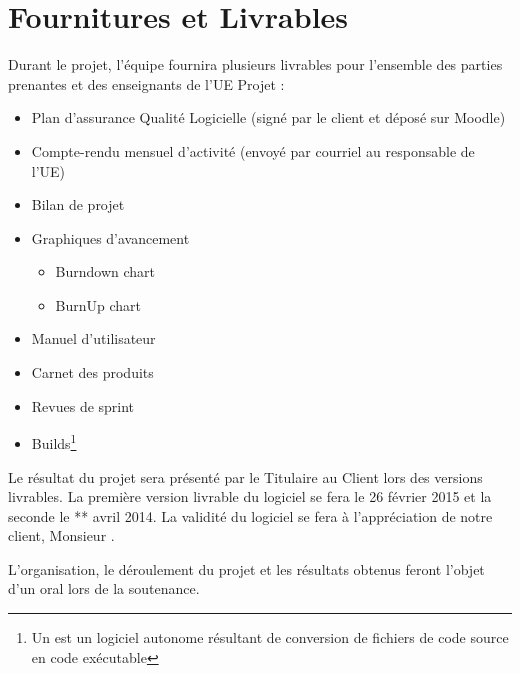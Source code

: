 \chapter{Fournitures et Livrables}
Durant le projet, l’équipe fournira plusieurs livrables pour l’ensemble des parties prenantes et des enseignants de l’UE Projet :

\begin{itemize}
	\item Plan d'assurance Qualité Logicielle (signé par le client et déposé sur Moodle)
	\item Compte-rendu mensuel d'activité (envoyé par courriel au responsable de l'UE)
	\item Bilan de projet
	\item Graphiques d’avancement
	\begin{itemize}
		\item Burndown chart
		\item BurnUp chart
	\end{itemize}
	\item Manuel d’utilisateur 
	\item Carnet des produits 
	\item Revues de sprint
	\item Builds\footnote{Un  est un  logiciel autonome résultant de conversion de fichiers de code source en code exécutable}
\end{itemize}

Le résultat du projet sera présenté par le Titulaire au Client lors des versions livrables. La première version livrable du logiciel se fera le 26 février 2015 et la seconde le ** avril 2014. La validité du logiciel se fera à l'appréciation de notre client, Monsieur .

L'organisation, le déroulement du projet et les résultats obtenus feront l'objet d'un oral lors de la soutenance. 